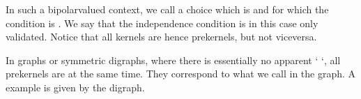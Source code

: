 \documentclass[a4paper,12pt,english]{sphinxhowto}
\begin{document}
In such a  bipolar\sphinxhyphen{}valued context, we call  a choice which is  and for which the  condition is . We say that the independence condition is in this case only  validated. Notice that all kernels are hence prekernels, but not vice\sphinxhyphen{}versa.

In graphs or symmetric digraphs, where there is essentially no apparent ‘  ‘, all prekernels are    at the same time. They correspond to what we call  in the graph. A  example is given by the  digraph.
\end{document}
